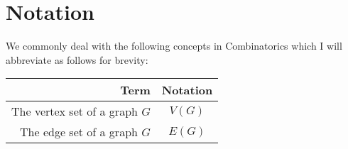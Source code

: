 \section{Notation}

We commonly deal with the following concepts in Combinatorics
which I will abbreviate as follows for brevity:
\begin{center}
    \begin{tabular}{ | r | c | }
        \hline
        Term & Notation \\
        \hline \hline
        The vertex set of a graph $G$ & $V(G)$ \\
        The edge set of a graph $G$ & $E(G)$ \\
        \hline
    \end{tabular}
\end{center}